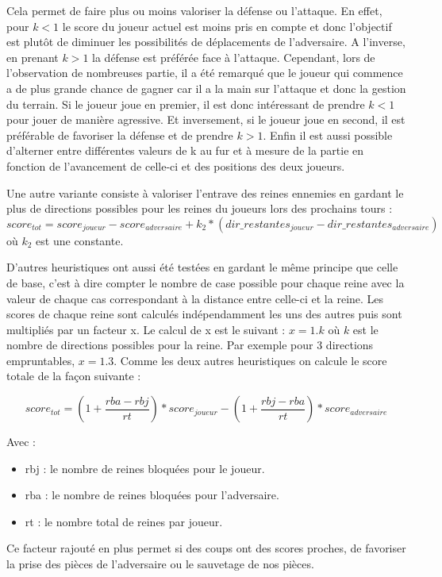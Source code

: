 \documentclass[a4paper]{article}
\begin{document}
Cela permet de faire plus ou moins valoriser la défense ou l'attaque. En effet, pour $k < 1$ le score du joueur actuel est moins pris en compte et donc l'objectif est plutôt de diminuer les possibilités de déplacements de l'adversaire. A l'inverse, en prenant $k > 1$ la défense est préférée face à l'attaque. Cependant, lors de l'observation de nombreuses partie, il a été remarqué que le joueur qui commence a de plus grande chance de gagner car il a la main sur l'attaque et donc la gestion du terrain. Si le joueur joue en premier, il est donc intéressant de prendre $k < 1$ pour jouer de manière agressive. Et inversement, si le joueur joue en second, il est préférable de favoriser la défense et de prendre $k > 1$. Enfin il est aussi possible d'alterner entre différentes valeurs de k au fur et à mesure de la partie en fonction de l'avancement de celle-ci et des positions des deux joueurs.

Une autre variante consiste à valoriser l'entrave des reines ennemies en gardant le plus de directions possibles pour les reines du joueurs lors des prochains tours :
\begin{equation}
    score_{tot} = score_{joueur} - score_{adversaire} 
    + k_2 * (dir\_restantes_{joueur} - dir\_restantes_{adversaire})
\end{equation}
où $k_2$ est une constante.


D'autres heuristiques ont aussi été testées en gardant le même principe que celle de base, c'est à dire compter le nombre de case possible pour chaque reine avec la valeur de chaque cas correspondant à la distance entre celle-ci et la reine. Les scores de chaque reine sont calculés indépendamment les uns des autres puis sont multipliés par un facteur x. Le calcul de x est le suivant : $x = 1.k$ où $k$ est le nombre de directions possibles pour la reine. Par exemple pour 3 directions empruntables, $x = 1.3$. Comme les deux autres heuristiques on calcule le score totale de la façon suivante :

\begin{equation}
    score_{tot} = (1 + \frac{rba - rbj}{rt})* score_{joueur} - (1 + \frac{rbj - rba}{rt})* score_{adversaire}
\end{equation}

Avec :
\begin{itemize}
    \item rbj : le nombre de reines bloquées pour le joueur.
    \item rba : le nombre de reines bloquées pour l'adversaire.
    \item rt : le nombre total de reines par joueur.
\end{itemize}
Ce facteur rajouté en plus permet si des coups ont des scores proches, de favoriser la prise des pièces de l'adversaire ou le sauvetage de nos pièces.
\end{document}
